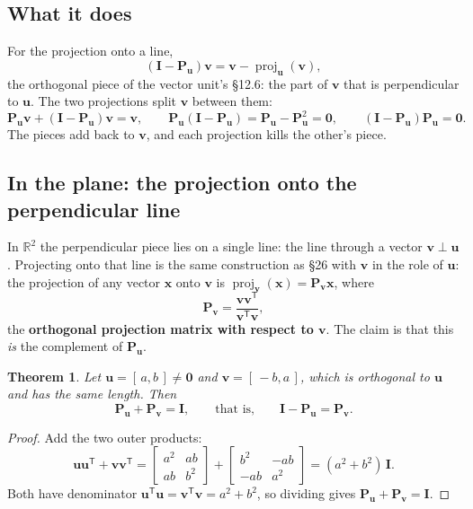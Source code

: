 \documentclass[11pt]{article}
\theoremstyle{plain}
\newtheorem{thm}{Theorem}[section]
\theoremstyle{definition}
\theoremstyle{remark}
\newcommand{\R}{\mathbb{R}}
\newcommand{\vc}[1]{\mathbf{#1}}
\newcommand{\mt}[1]{\mathbf{#1}}
\newcommand{\T}{^{\mathsf{T}}}
\newcommand{\proj}[2]{\operatorname{proj}_{#1}(#2)}
\begin{document}
\subsection{What it does}
For the projection onto a line,
\[
  (\mt{I}-\mt{P}_{\vc{u}})\vc{v}=\vc{v}-\proj{\vc{u}}{\vc{v}},
\]
the orthogonal piece of the vector unit's \S12.6: the part of $\vc{v}$ that is
perpendicular to $\vc{u}$. The two projections split $\vc{v}$ between them:
\[
  \mt{P}_{\vc{u}}\vc{v}+(\mt{I}-\mt{P}_{\vc{u}})\vc{v}=\vc{v},
  \qquad
  \mt{P}_{\vc{u}}(\mt{I}-\mt{P}_{\vc{u}})=\mt{P}_{\vc{u}}-\mt{P}_{\vc{u}}^{2}=\mt{0},
  \qquad
  (\mt{I}-\mt{P}_{\vc{u}})\mt{P}_{\vc{u}}=\mt{0}.
\]
The pieces add back to $\vc{v}$, and each projection kills the other's piece.

\subsection{In the plane: the projection onto the perpendicular line}
In $\R^{2}$ the perpendicular piece lies on a single line: the line through a
vector $\vc{v}\perp\vc{u}$. Projecting onto that line is the same construction
as \S26 with $\vc{v}$ in the role of $\vc{u}$: the projection of any vector
$\vc{x}$ onto $\vc{v}$ is $\proj{\vc{v}}{\vc{x}}=\mt{P}_{\vc{v}}\vc{x}$, where
\[
  \mt{P}_{\vc{v}}=\frac{\vc{v}\vc{v}\T}{\vc{v}\T\vc{v}},
\]
the \textbf{orthogonal projection matrix with respect to $\vc{v}$}. The claim is
that this \emph{is} the complement of $\mt{P}_{\vc{u}}$.

\begin{thm}
\label{thm:complement}
Let $\vc{u}=[\,a,b\,]\neq\vc{0}$ and $\vc{v}=[\,-b,a\,]$, which is orthogonal to
$\vc{u}$ and has the same length. Then
\[
  \mt{P}_{\vc{u}}+\mt{P}_{\vc{v}}=\mt{I},
  \qquad\text{that is,}\qquad
  \mt{I}-\mt{P}_{\vc{u}}=\mt{P}_{\vc{v}} .
\]
\end{thm}

\begin{proof}
Add the two outer products:
\[
  \vc{u}\vc{u}\T+\vc{v}\vc{v}\T
  =\begin{bmatrix}a^{2}&ab\\ab&b^{2}\end{bmatrix}
   +\begin{bmatrix}b^{2}&-ab\\-ab&a^{2}\end{bmatrix}
  =(a^{2}+b^{2})\,\mt{I}.
\]
Both have denominator $\vc{u}\T\vc{u}=\vc{v}\T\vc{v}=a^{2}+b^{2}$, so dividing
gives $\mt{P}_{\vc{u}}+\mt{P}_{\vc{v}}=\mt{I}$.
\end{proof}
\end{document}
